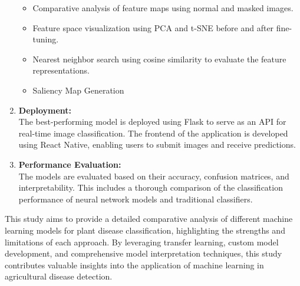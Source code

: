 \begin{enumerate}
\begin{itemize}
        \item Comparative analysis of feature maps using normal and masked images.
        \item Feature space visualization using PCA and t-SNE before and after fine-tuning.
        \item Nearest neighbor search using cosine similarity to evaluate the feature representations.
        \item Saliency Map Generation
    \end{itemize}
    \item \textbf{Deployment:} \\
    The best-performing model is deployed using Flask to serve as an API for real-time image classification. The frontend of the application is developed using React Native, enabling users to submit images and receive predictions.
    \item \textbf{Performance Evaluation:} \\
    The models are evaluated based on their accuracy, confusion matrices, and interpretability. This includes a thorough comparison of the classification performance of neural network models and traditional classifiers.
\end{enumerate}


This study aims to provide a detailed comparative analysis of different machine learning models for plant disease classification, highlighting the strengths and limitations of each approach. By leveraging transfer learning, custom model development, and comprehensive model interpretation techniques, this study contributes valuable insights into the application of machine learning in agricultural disease detection.\par\vspace{1em}